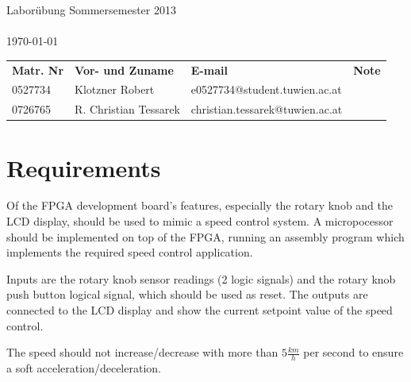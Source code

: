 \documentclass[a4paper,10pt]{scrartcl}
\begin{document}
\begin{titlepage}
\begin{center}
\begin{Large}

\sffamily \vspace*{\fill}{Institut f\"ur Computertechnik\\
Labor integrierte Schaltungen\\
384.088\\}
\vfill { Labor\"ubung Sommersemester 2013\\}
\vspace{10mm}{Betreuer: Dipl.-Ing. Herr Nachtnebel}\\
\today\\
\end{Large}
\vfill

\begin{tabular}{llll}
\textbf{Matr. Nr} & \textbf{Vor- und Zuname} & \textbf{E-mail} & \textbf{Note} \\
0527734 & Klotzner Robert & e0527734@student.tuwien.ac.at &  \\
0726765 & R. Christian Tessarek & christian.tessarek@tuwien.ac.at &
\end{tabular}

\end{center}
\end{titlepage}



\pagebreak
\tableofcontents
\pagebreak


\section{Requirements}
\label{sec:aufgabe}

Of the FPGA development board's features, especially the rotary knob and the LCD display, should be used to mimic a speed control system. 
A micropocessor should be implemented on top of the FPGA, running an assembly program which implements the required speed control application. 

Inputs are the rotary knob sensor readings (2 logic signals) and the rotary knob push button logical signal, which should be used as reset. 
The outputs are connected to the LCD display and show the current setpoint value of the speed control. 

The speed should not increase/decrease with more than $5 \frac{km}{h}$ per second to ensure a soft acceleration/deceleration. 
\end{document}
